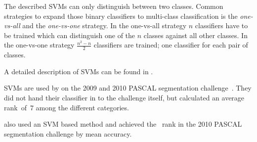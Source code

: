 The described \glspl{SVM} can only distinguish between two classes. Common
strategies to expand those binary classifiers to multi-class classification is
the \textit{one-vs-all} and the \textit{one-vs-one} strategy. In the one-vs-all
strategy $n$ classifiers have to be trained which can distinguish one of the $n$
classes against all other classes. In the one-vs-one strategy $\frac{n^2 - n}{2}$
classifiers are trained; one classifier for each pair of classes.

A detailed description of \glspl{SVM} can be found in \cite{burges1998tutorial}.

\Glspl{SVM} are used by \cite{yang2012layered} on the 2009 and 2010 PASCAL
segmentation challenge~\cite{everingham2010pascal}. They did not hand their
classifier in to the challenge itself, but calculated an average rank~of~7
among the different categories.

\cite{felzenszwalb2010object} also used an SVM based method and achieved the
~rank in the 2010 PASCAL segmentation challenge by mean accuracy.